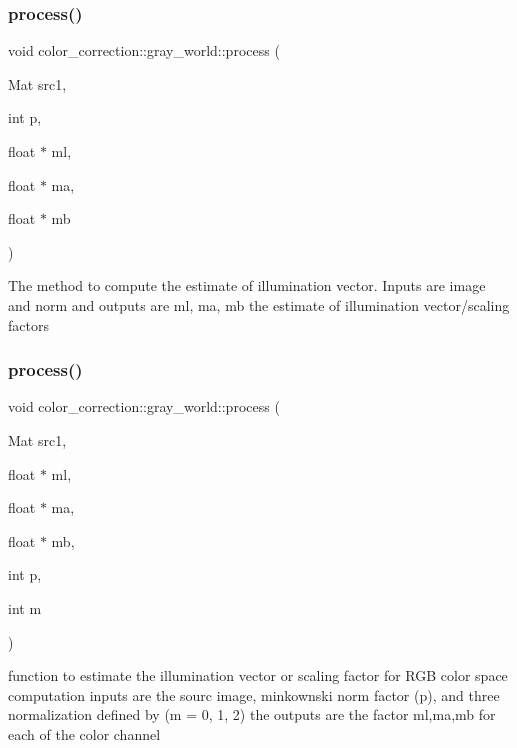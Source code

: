 \subsubsection{\texorpdfstring{process()}{process()}\hspace{0.1cm}{\footnotesize\ttfamily [1/2]}}
{\footnotesize\ttfamily void color\+\_\+correction\+::gray\+\_\+world\+::process (\begin{DoxyParamCaption}\item[{Mat}]{src1,  }\item[{int}]{p,  }\item[{float $\ast$}]{ml,  }\item[{float $\ast$}]{ma,  }\item[{float $\ast$}]{mb }\end{DoxyParamCaption})}

The method to compute the estimate of illumination vector. Inputs are image and norm and outputs are ml, ma, mb the estimate of illumination vector/scaling factors \mbox{\label{classcolor__correction_1_1gray__world_a4a0d5ba6b9e4ae8d15a664f6e60b4a24}} 
\subsubsection{\texorpdfstring{process()}{process()}\hspace{0.1cm}{\footnotesize\ttfamily [2/2]}}
{\footnotesize\ttfamily void color\+\_\+correction\+::gray\+\_\+world\+::process (\begin{DoxyParamCaption}\item[{Mat}]{src1,  }\item[{float $\ast$}]{ml,  }\item[{float $\ast$}]{ma,  }\item[{float $\ast$}]{mb,  }\item[{int}]{p,  }\item[{int}]{m }\end{DoxyParamCaption})}

function to estimate the illumination vector or scaling factor for R\+GB color space computation inputs are the sourc image, minkownski norm factor (p), and three normalization defined by (m = 0, 1, 2) the outputs are the factor ml,ma,mb for each of the color channel \mbox{\label{classcolor__correction_1_1gray__world_a5d522f9b4cbc22b417463e8542164364}} 
